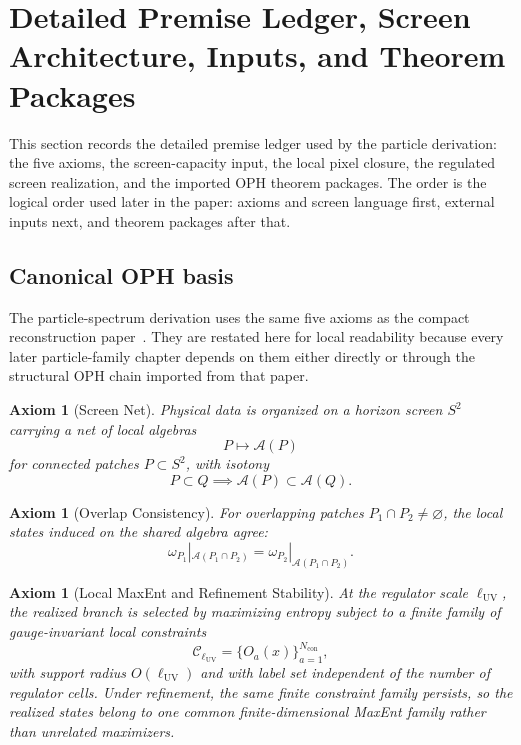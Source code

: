 \documentclass[11pt]{article}
\newtheorem{axiom}[theorem]{Axiom}
\begin{document}
\section{Detailed Premise Ledger, Screen Architecture, Inputs, and Theorem Packages}\label{sec:particle-premise-ledger}

This section records the detailed premise ledger used by the particle derivation: the five axioms,
the screen-capacity input, the local pixel closure, the regulated screen realization, and the imported
OPH theorem packages. The order is the logical order used later in the paper: axioms and screen
language first, external inputs next, and theorem packages after that.

\subsection{Canonical OPH basis}

The particle-spectrum derivation uses the same five axioms as the compact reconstruction
paper~\cite{ophcompact}. They are restated here for local readability because every later
particle-family chapter depends on them either directly or through the structural OPH chain
imported from that paper.

\begin{axiom}[Screen Net]\label{ax:screen}
Physical data is organized on a horizon screen \(S^2\) carrying a net of local algebras
\[
P \longmapsto \mathcal A(P)
\]
for connected patches \(P\subset S^2\), with isotony
\[
P\subset Q \implies \mathcal A(P)\subset \mathcal A(Q).
\]
\end{axiom}

\begin{axiom}[Overlap Consistency]\label{ax:overlap}
For overlapping patches \(P_1\cap P_2\neq\varnothing\), the local states induced on the shared
algebra agree:
\[
\omega_{P_1}|_{\mathcal A(P_1\cap P_2)}
=
\omega_{P_2}|_{\mathcal A(P_1\cap P_2)}.
\]
\end{axiom}

\begin{axiom}[Local MaxEnt and Refinement Stability]\label{ax:maxent}
At the regulator scale \(\ell_{\mathrm{UV}}\), the realized branch is selected by maximizing
entropy subject to a finite family of gauge-invariant local constraints
\[
\mathcal C_{\ell_{\mathrm{UV}}}=\{O_a(x)\}_{a=1}^{N_{\mathrm{con}}},
\]
with support radius \(O(\ell_{\mathrm{UV}})\) and with label set independent of the number of
regulator cells. Under refinement, the same finite constraint family persists, so the realized
states belong to one common finite-dimensional MaxEnt family rather than unrelated maximizers.
\end{axiom}
\end{document}
